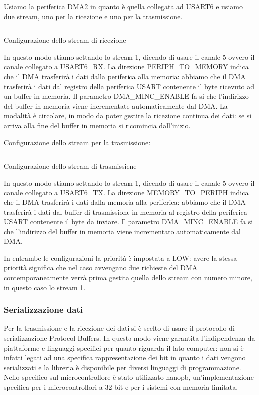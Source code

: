Usiamo la periferica DMA2 in quanto è quella collegata ad USART6 e usiamo due stream, uno per la ricezione e uno per la trasmissione.

\begin{listing}[ht]
\inputminted[frame=single,framesep=10pt]{c}{codice/dma2_rx_config.c}
\caption{Configurazione dello stream di ricezione}
\label{listing:DMA_rx_config}
\end{listing}

In questo modo stiamo settando lo stream 1, dicendo di usare il canale 5 ovvero il canale collegato a USART6\_RX. La direzione PERIPH\_TO\_MEMORY indica che il DMA trasferirà i dati dalla periferica alla memoria: abbiamo che il DMA trasferirà i dati dal registro della periferica USART contenente il byte ricevuto ad un buffer in memoria. Il parametro DMA\_MINC\_ENABLE fa si che l'indirizzo del buffer in memoria viene incrementato automaticamente dal DMA. 
La modalità è circolare, in modo da poter gestire la ricezione continua dei dati: se si arriva alla fine del buffer in memoria si ricomincia dall'inizio.

Configurazione dello stream per la trasmissione:

\begin{listing}[ht]
\inputminted[frame=single,framesep=10pt]{c}{codice/dma2_tx_config.c}
\caption{Configurazione dello stream di trasmissione}
\label{listing:DMA_tx_config}
\end{listing}

In questo modo stiamo settando lo stream 1, dicendo di usare il canale 5 ovvero il canale collegato a USART6\_TX. La direzione MEMORY\_TO\_PERIPH indica che il DMA trasferirà i dati dalla memoria alla periferica: abbiamo che il DMA trasferirà i dati dal buffer di trasmissione in memoria al registro della periferica USART contenente il byte da inviare. Il parametro DMA\_MINC\_ENABLE fa si che l'indirizzo del buffer in memoria viene incrementato automaticamente dal DMA. 

In entrambe le configurazioni la priorità è impostata a LOW: avere la stessa priorità significa che nel caso avvengano due richieste del DMA contemporaneamente verrà prima gestita quella dello stream con numero minore, in questo caso lo stream 1.


\subsubsection{Serializzazione dati}
Per la trasmissione e la ricezione dei dati si è scelto di usare il protocollo di serializzazione Protocol Buffers. In questo modo viene garantita l'indipendenza da piattaforme e linguaggi specifici per quanto riguarda il lato computer: non si è infatti legati ad una specifica rappresentazione dei bit 
in quanto i dati vengono serializzati e la libreria è disponibile per diversi linguaggi di programmazione. Nello specifico sul microcontrollore è stato utilizzato nanopb, un'implementazione specifica per i microcontrollori a 32 bit e per i sistemi con memoria limitata.

